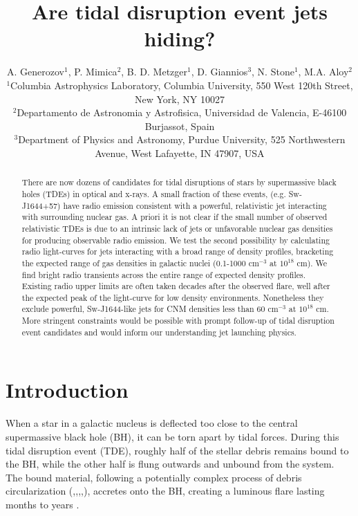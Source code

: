 \documentclass[usenatbib,fleqn]{mnras}
\title{Are tidal disruption event jets hiding?}
\author[Generozov et al.]{ A. Generozov$^{1}$, P. Mimica$^{2}$,
  B. D. Metzger$^{1}$,
  D. Giannios$^{3}$, 
  N. Stone$^{1}$,
  M.A. Aloy$^{2}$ 
  \\
  $^{1}$Columbia Astrophysics Laboratory, Columbia University, 550 West 120th Street, New York, NY 10027\\
  $^{2}$Departamento de Astronomia y Astrofisica, Universidad de Valencia, E-46100 Burjassot, Spain\\
  $^{3}$Department of Physics and Astronomy, Purdue University, 525
  Northwestern Avenue, West Lafayette, IN 47907, USA}
\begin{document}
\maketitle
\begin{abstract}
  There are now dozens of candidates for tidal disruptions of stars by
  supermassive black holes (TDEs) in optical and x-rays. A small
  fraction of these events, (e.g. Sw-J1644+57) have radio emission
  consistent with a powerful, relativistic jet interacting with
  surrounding nuclear gas. A priori it is not clear if the small
  number of observed relativistic TDEs is due to an intrinsic lack of jets
  or unfavorable nuclear gas densities for producing observable radio
  emission. We test the second possibility by calculating radio
  light-curves for jets interacting with a broad range of density
  profiles, bracketing the expected range of gas densities in galactic
  nuclei (0.1-1000 cm$^{-3}$ at $10^{18}$ cm). We find bright radio
  transients across the entire range of expected density
  profiles. Existing radio upper limits are often taken decades after
  the observed flare, well after the expected peak of the light-curve
  for low density environments. Nonetheless they exclude powerful,
  Sw-J1644-like jets for CNM densities less than 60 cm$^{-3}$ at
  $10^{18}$ cm. More stringent constraints would be possible with
  prompt follow-up of tidal disruption event candidates and would
  inform our understanding jet launching physics.
\end{abstract}
\section{Introduction}
\label{sec:intro}
When a star in a galactic nucleus is deflected too close to the
central supermassive black hole (BH), it can be torn apart by tidal
forces.  During this tidal disruption event (TDE), roughly half of the
stellar debris remains bound to the BH, while the other half is flung
outwards and unbound from the system.  The bound material, following a
potentially complex process of debris circularization
(\citealt{Guillochon+2013},\citealt{Hayasaki+2013},\citealt{Hayasaki+2015},\citealt{Shiokawa+2015},\citealt{Bonnerot+2015}),
accretes onto the BH, creating a luminous flare lasting months to
years \citep{Hills1975, Carter+1982, Rees1988}.
\end{document}

